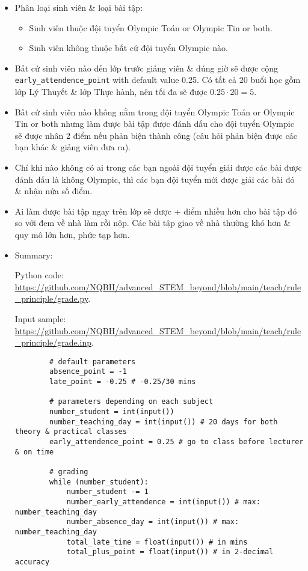 \documentclass{article}
\begin{document}
\begin{itemize}
	\item Phân loại sinh viên \& loại bài tập:
	\begin{itemize}
		\item Sinh viên thuộc đội tuyển Olympic Toán or Olympic Tin or both.
		\item Sinh viên không thuộc bất cứ đội tuyển Olympic nào.
	\end{itemize}
	\item Bất cứ sinh viên nào đến lớp trước giảng viên \& đúng giờ sẽ được cộng \verb|early_attendence_point| with default value 0.25. Có tất cả 20 buổi học gồm lớp Lý Thuyết \& lớp Thực hành, nên tối đa sẽ được $0.25\cdot20 = 5$.
	\item Bất cứ sinh viên nào không nằm trong đội tuyển Olympic Toán or Olympic Tin or both nhưng làm được bài tập được đánh dấu cho đội tuyển Olympic sẽ được nhân 2 điểm nếu phản biện thành công (câu hỏi phản biện được các bạn khác \& giảng viên đưa ra).
	\item Chỉ khi nào không có ai trong các bạn ngoài đội tuyển giải được các bài được đánh dấu là không Olympic, thì các bạn đội tuyển mới được giải các bài đó \& nhận nửa số điểm.
	\item Ai làm được bài tập ngay trên lớp sẽ được + điểm nhiều hơn cho bài tập đó so với đem về nhà làm rồi nộp. Các bài tập giao về nhà thường khó hơn \& quy mô lớn hơn, phức tạp hơn.
	\item Summary:
	
	Python code: \url{https://github.com/NQBH/advanced_STEM_beyond/blob/main/teach/rule_principle/grade.py}.
	
	Input sample: \url{https://github.com/NQBH/advanced_STEM_beyond/blob/main/teach/rule_principle/grade.inp}.
	\begin{verbatim}
		# default parameters
		absence_point = -1
		late_point = -0.25 # -0.25/30 mins
		
		# parameters depending on each subject
		number_student = int(input())
		number_teaching_day = int(input()) # 20 days for both theory & practical classes
		early_attendence_point = 0.25 # go to class before lecturer & on time
		
		# grading
		while (number_student):
		    number_student -= 1
		    number_early_attendence = int(input()) # max: number_teaching_day
		    number_absence_day = int(input()) # max: number_teaching_day
		    total_late_time = float(input()) # in mins
		    total_plus_point = float(input()) # in 2-decimal accuracy
		    

\end{verbatim}
\end{itemize}
\end{document}
